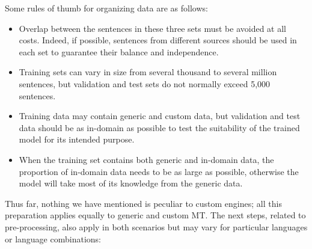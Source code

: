 \documentclass[output=paper]{langscibook}
\begin{document}
Some rules of thumb for organizing data are as follows:

\begin{itemize}

\item Overlap between the sentences in these three sets must be avoided at all costs. Indeed, if possible, sentences from different sources should be used in each set to guarantee their balance and independence. 

\item Training sets can vary in size from several thousand to several million sentences, but validation and test sets do not normally exceed 5,000 sentences. 

\item Training data may contain generic and custom data, but validation and test data should be as in-domain as possible to test the suitability of the trained model for its intended purpose. 

\item When the training set contains both generic and in-domain data, the proportion of in-domain data needs to be as large as possible, otherwise the model will take most of its knowledge from the generic data.

\end{itemize}

Thus far, nothing we have mentioned is peculiar to custom engines; all this preparation applies equally to generic and custom MT. The next steps, related to pre-processing, also apply in both scenarios but may vary for particular languages or language combinations:
\end{document}
